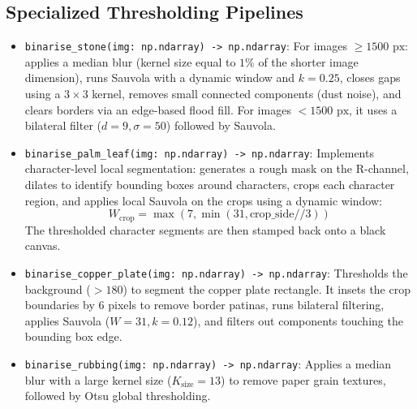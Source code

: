 \subsection{Specialized Thresholding Pipelines}
\begin{itemize}
	\item \texttt{binarise\_stone(img: np.ndarray) -> np.ndarray}:
	For images $\ge 1500\text{ px}$: applies a median blur (kernel size equal to $1\%$ of the shorter image dimension), runs Sauvola with a dynamic window and $k=0.25$, closes gaps using a $3\times3$ kernel, removes small connected components (dust noise), and clears borders via an edge-based flood fill. For images $< 1500\text{ px}$, it uses a bilateral filter ($d=9, \sigma=50$) followed by Sauvola.
	
	\item \texttt{binarise\_palm\_leaf(img: np.ndarray) -> np.ndarray}:
	Implements character-level local segmentation: generates a rough mask on the R-channel, dilates to identify bounding boxes around characters, crops each character region, and applies local Sauvola on the crops using a dynamic window:
	\begin{equation}
	W_{\text{crop}} = \max\left(7, \min\left(31, \text{crop\_side} // 3\right)\right)
	\end{equation}
	The thresholded character segments are then stamped back onto a black canvas.
	
	\item \texttt{binarise\_copper\_plate(img: np.ndarray) -> np.ndarray}:
	Thresholds the background ($> 180$) to segment the copper plate rectangle. It insets the crop boundaries by 6 pixels to remove border patinas, runs bilateral filtering, applies Sauvola ($W=31, k=0.12$), and filters out components touching the bounding box edge.
	
	\item \texttt{binarise\_rubbing(img: np.ndarray) -> np.ndarray}:
	Applies a median blur with a large kernel size ($K_{\text{size}}=13$) to remove paper grain textures, followed by Otsu global thresholding.
\end{itemize}

